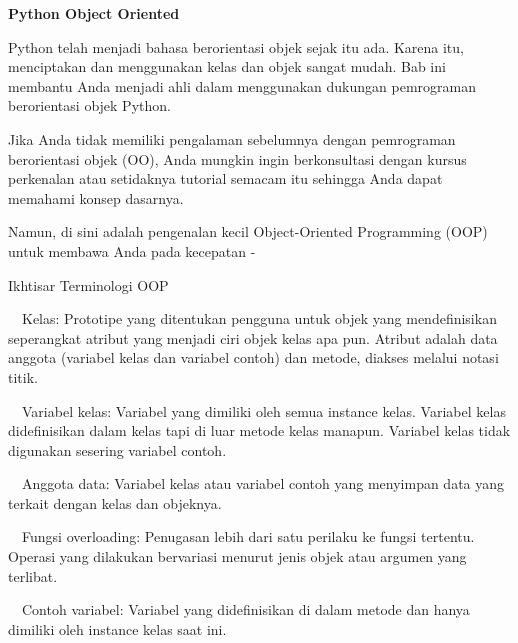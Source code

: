 \documentclass[a4paper,12pt]{report}
\begin{document}
\sloppy
\begin{center}{\fontsize{24pt}{24pt}\selectfont \textbf{Python Object Oriented} \\}\end{center} \par
\noindent 
Python telah menjadi bahasa berorientasi objek sejak itu ada. Karena itu, menciptakan dan menggunakan kelas dan objek sangat mudah. Bab ini membantu Anda menjadi ahli dalam menggunakan dukungan pemrograman berorientasi objek Python. \par
\noindent 
\vspace{12pt}
\noindent 
Jika Anda tidak memiliki pengalaman sebelumnya dengan pemrograman berorientasi objek (OO), Anda mungkin ingin berkonsultasi dengan kursus perkenalan atau setidaknya tutorial semacam itu sehingga Anda dapat memahami konsep dasarnya. \par
\noindent 
\vspace{12pt}
\noindent 
Namun, di sini adalah pengenalan kecil Object-Oriented Programming (OOP) untuk membawa Anda pada kecepatan - \par
\noindent 
Ikhtisar Terminologi OOP \par
\noindent 
\vspace{12pt}
\noindent 
 $  $ $  $ $  $ $  $Kelas: Prototipe yang ditentukan pengguna untuk objek yang mendefinisikan seperangkat atribut yang menjadi ciri objek kelas apa pun. Atribut adalah data anggota (variabel kelas dan variabel contoh) dan metode, diakses melalui notasi titik. \par
\noindent 
\vspace{12pt}
\noindent 
 $  $ $  $ $  $ $  $Variabel kelas: Variabel yang dimiliki oleh semua instance kelas. Variabel kelas didefinisikan dalam kelas tapi di luar metode kelas manapun. Variabel kelas tidak digunakan sesering variabel contoh. \par
\noindent 
\vspace{12pt}
\noindent 
 $  $ $  $ $  $ $  $Anggota data: Variabel kelas atau variabel contoh yang menyimpan data yang terkait dengan kelas dan objeknya. \par
\noindent 
\vspace{12pt}
\noindent 
 $  $ $  $ $  $ $  $Fungsi overloading: Penugasan lebih dari satu perilaku ke fungsi tertentu. Operasi yang dilakukan bervariasi menurut jenis objek atau argumen yang terlibat. \par
\noindent 
\vspace{12pt}
\noindent 
 $  $ $  $ $  $ $  $Contoh variabel: Variabel yang didefinisikan di dalam metode dan hanya dimiliki oleh instance kelas saat ini. \par
\end{document}
